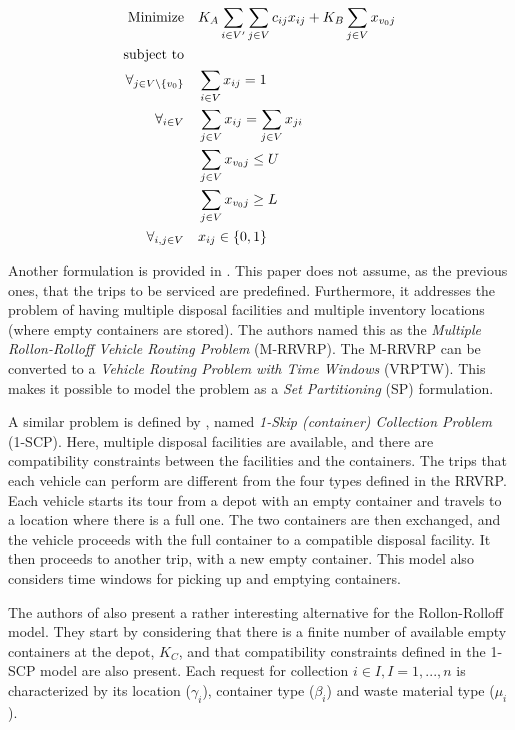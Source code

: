 \begin{align}
	\mbox{Minimize} & \quad K_A \sum_{i \in V^\prime} \sum_{j \in V} c_{ij} x_{ij} +
				K_B \sum_{j \in V} x_{v_0j}
	\\
	\mbox{subject to} & \notag{}
	\\
	\forall_{j \in V \setminus \{v_0\}} & \quad \sum_{i \in V} x_{ij} = 1
	\label{avrp:indegree}
	\\
	\forall_{i \in V} & \quad \sum_{j \in V} x_{ij} = \sum_{j \in V} x_{ji}
	\label{avrp:in-out}
	\\
	& \quad \sum_{j \in V} x_{v_0j} \leq U \label{avrp:upper-k} \\
	& \quad \sum_{j \in V} x_{v_0j} \geq L \label{avrp:lower-k} \\
	\forall_{i, j \in V} & \quad x_{ij} \in \{0, 1\}
\end{align}

Another formulation is provided in \citet{Baldacci06}. This paper does not
assume, as the previous ones, that the trips to be serviced are predefined.
Furthermore, it addresses the problem of having multiple disposal facilities
and multiple inventory locations (where empty containers are stored). The
authors named this as the \textit{Multiple Rollon-Rolloff Vehicle Routing
Problem} (M-RRVRP). The M-RRVRP can be converted to a \textit{Vehicle Routing
Problem with Time Windows} (VRPTW). This makes it possible to model the problem
as a \textit{Set Partitioning} (SP) formulation.

A similar problem is defined by \citet{Archetti05}, named \textit{1-Skip
(container) Collection Problem} (1-SCP). Here, multiple disposal facilities are
available, and there are compatibility constraints between the facilities and
the containers. The trips that each vehicle can perform are different from the
four types defined in the RRVRP. Each vehicle starts its tour from a depot with
an empty container and travels to a location where there is a full one. The two
containers are then exchanged, and the vehicle proceeds with the full container
to a compatible disposal facility. It then proceeds to another trip, with a new
empty container. This model also considers time windows for picking up and
emptying containers.

The authors of \citet{Aringhieri04} also present a rather interesting
alternative for the Rollon-Rolloff model. They start by considering that there
is a finite number of available empty containers at the depot, $K_C$, and that
compatibility constraints defined in the 1-SCP model are also present. Each
request for collection $i \in I, I = {1, ..., n}$ is characterized by its
location ($\gamma_i$), container type ($\beta_{i}$) and waste material type
($\mu_i$). 

